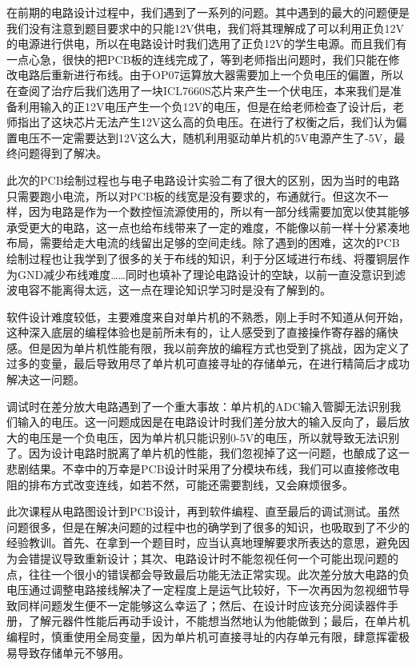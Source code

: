 \documentclass{zjureport}
\begin{document}
        在前期的电路设计过程中，我们遇到了一系列的问题。其中遇到的最大的问题便是我们没有注意到题目要求中的只能12V供电，我们将其理解成了可以利用正负12V的电源进行供电，所以在电路设计时我们选用了正负12V的学生电源。而且我们有一点心急，很快的把PCB板的连线完成了，等到老师指出问题时，我们只能在修改电路后重新进行布线。由于OP07运算放大器需要加上一个负电压的偏置，所以在查阅了治疗后我们选用了一块ICL7660S芯片来产生一个伏电压，本来我们是准备利用输入的正12V电压产生一个负12V的电压，但是在给老师检查了设计后，老师指出了这块芯片无法产生12V这么高的负电压。在进行了权衡之后，我们认为偏置电压不一定需要达到12V这么大，随机利用驱动单片机的5V电源产生了-5V，最终问题得到了解决。


        此次的PCB绘制过程也与电子电路设计实验二有了很大的区别，因为当时的电路只需要跑小电流，所以对PCB板的线宽是没有要求的，布通就行。但这次不一样，因为电路是作为一个数控恒流源使用的，所以有一部分线需要加宽以使其能够承受更大的电路，这一点也给布线带来了一定的难度，不能像以前一样十分紧凑地布局，需要给走大电流的线留出足够的空间走线。除了遇到的困难，这次的PCB绘制过程也让我学到了很多的关于布线的知识，利于分区域进行布线、将覆铜层作为GND减少布线难度……同时也填补了理论电路设计的空缺，以前一直没意识到滤波电容不能离得太远，这一点在理论知识学习时是没有了解到的。


        软件设计难度较低，主要难度来自对单片机的不熟悉，刚上手时不知道从何开始，这种深入底层的编程体验也是前所未有的，让人感受到了直接操作寄存器的痛快感。但是因为单片机性能有限，我以前奔放的编程方式也受到了挑战，因为定义了过多的变量，最后导致用尽了单片机可直接寻址的存储单元，在进行精简后才成功解决这一问题。


        调试时在差分放大电路遇到了一个重大事故：单片机的ADC输入管脚无法识别我们输入的电压。这一问题成因是在电路设计时我们差分放大的输入反向了，最后放大的电压是一个负电压，因为单片机只能识别0-5V的电压，所以就导致无法识别了。因为设计电路时脱离了单片机的性能，我们忽视掉了这一问题，也酿成了这一悲剧结果。不幸中的万幸是PCB设计时采用了分模块布线，我们可以直接修改电阻的排布方式改变连线，如若不然，可能还需要割线，又会麻烦很多。


        此次课程从电路图设计到PCB设计，再到软件编程、直至最后的调试测试。虽然问题很多，但是在解决问题的过程中也的确学到了很多的知识，也吸取到了不少的经验教训。首先、在拿到一个题目时，应当认真地理解要求所表达的意思，避免因为会错提议导致重新设计；其次、电路设计时不能忽视任何一个可能出现问题的点，往往一个很小的错误都会导致最后功能无法正常实现。此次差分放大电路的负电压通过调整电路接线解决了一定程度上是运气比较好，下一次再因为忽视细节导致同样问题发生便不一定能够这么幸运了；然后、在设计时应该充分阅读器件手册，了解元器件性能后再动手设计，不能想当然地认为他能做到；最后，在单片机编程时，慎重使用全局变量，因为单片机可直接寻址的内存单元有限，肆意挥霍极易导致存储单元不够用。
        \newpage
\end{document}
